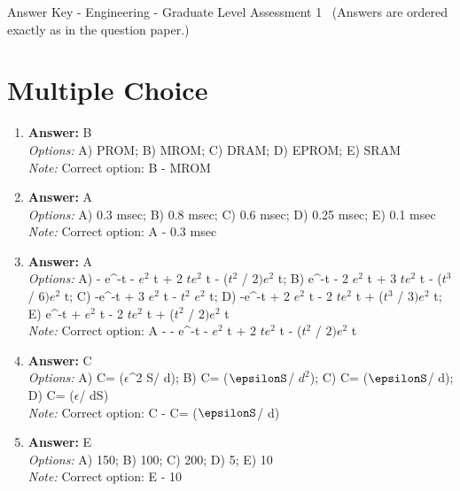 \documentclass[12pt]{article}
\begin{document}
\begin{center}
Answer Key - Engineering - Graduate Level Assessment 1 \
\small (Answers are ordered exactly as in the question paper.)
\end{center}

\section*{Multiple Choice}
\begin{enumerate}[label=\arabic*.]
\item \textbf{Answer:} B
\\ \textit{Options:} A) PROM; B) MROM; C) DRAM; D) EPROM; E) SRAM
\\ \textit{Note:} Correct option: B - MROM
\item \textbf{Answer:} A
\\ \textit{Options:} A) 0.3 msec; B) 0.8 msec; C) 0.6 msec; D) 0.25 msec; E) 0.1 msec
\\ \textit{Note:} Correct option: A - 0.3 msec
\item \textbf{Answer:} A
\\ \textit{Options:} A) - e^-t - $e^2$ t + 2 $te^2$ t - ($t^2$ / $2)e^2$ t; B) e^-t - 2 $e^2$ t + 3 $te^2$ t - ($t^3$ / $6)e^2$ t; C) -e^-t + 3 $e^2$ t - $t^2$ $e^2$ t; D) -e^-t + 2 $e^2$ t - 2 $te^2$ t + ($t^3$ / $3)e^2$ t; E) e^-t + $e^2$ t - 2 $te^2$ t + ($t^2$ / $2)e^2$ t
\\ \textit{Note:} Correct option: A - - e^-t - $e^2$ t + 2 $te^2$ t - ($t^2$ / $2)e^2$ t
\item \textbf{Answer:} C
\\ \textit{Options:} A) C= (\ensuremath{\epsilon}^2 S/ d); B) C= (\ensuremath{\epsilonS}/ $d^2$); C) C= (\ensuremath{\epsilonS}/ d); D) C= (\ensuremath{\epsilon}/ dS)
\\ \textit{Note:} Correct option: C - C= (\ensuremath{\epsilonS}/ d)
\item \textbf{Answer:} E
\\ \textit{Options:} A) 150; B) 100; C) 200; D) 5; E) 10
\\ \textit{Note:} Correct option: E - 10
\end{enumerate}
\end{document}
